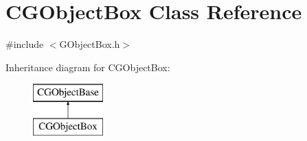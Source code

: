 \hypertarget{class_c_g_object_box}{}\section{C\+G\+Object\+Box Class Reference}
\label{class_c_g_object_box}


{\ttfamily \#include $<$G\+Object\+Box.\+h$>$}

Inheritance diagram for C\+G\+Object\+Box\+:\begin{figure}[H]
\begin{center}
\leavevmode
\includegraphics[height=2.000000cm]{class_c_g_object_box}
\end{center}
\end{figure}
